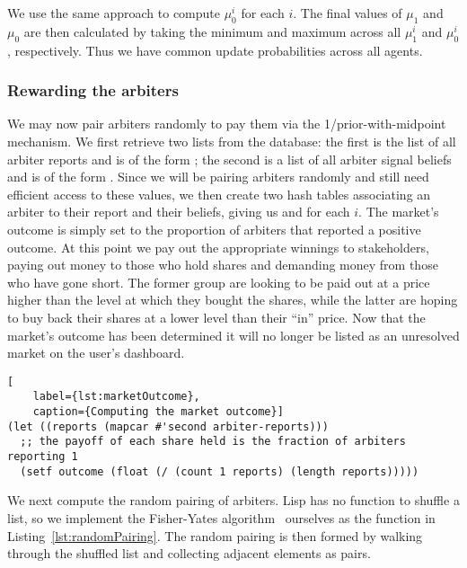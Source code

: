 We use the same approach to compute $\mu_0^i$ for each $i$. The final values of
$\mu_1$ and $\mu_0$ are then calculated by taking the minimum and maximum
across all $\mu_1^i$ and $\mu_0^i$, respectively. Thus we have common update
probabilities across all agents.

\subsubsection{Rewarding the arbiters}

We may now pair arbiters randomly to pay them via the 1/prior-with-midpoint
mechanism. We first retrieve two lists from the database: the first is the list
of all arbiter reports and is of the form ; the second is a list of all arbiter signal beliefs and is of the
form .
Since we will be pairing arbiters randomly and still need efficient access to
these values, we then create two hash tables associating an arbiter to their
report and their beliefs, giving us  and
 for each $i$. The
market's outcome is simply set to the proportion of arbiters that reported a
positive outcome. At this point we pay out the appropriate winnings to
stakeholders, paying out money to those who hold shares and demanding money
from those who have gone short. The former group are looking to be paid out at
a price higher than the level at which they bought the shares, while the latter
are hoping to buy back their shares at a lower level than their ``in'' price.
Now that the market's outcome has been determined it will no longer be listed
as an unresolved market on the user's dashboard.

\begin{lstlisting}[
	label={lst:marketOutcome},
	caption={Computing the market outcome}]
(let ((reports (mapcar #'second arbiter-reports)))
  ;; the payoff of each share held is the fraction of arbiters reporting 1
  (setf outcome (float (/ (count 1 reports) (length reports)))))
\end{lstlisting}

We next compute the random pairing of arbiters. Lisp has no function to shuffle
a list, so we implement the Fisher-Yates
algorithm~\cite[pg.~26-27]{FisherYates1938} ourselves as the 
function in Listing~\ref{lst:randomPairing}. The random pairing is then formed
by walking through the shuffled list and collecting adjacent elements as pairs.

